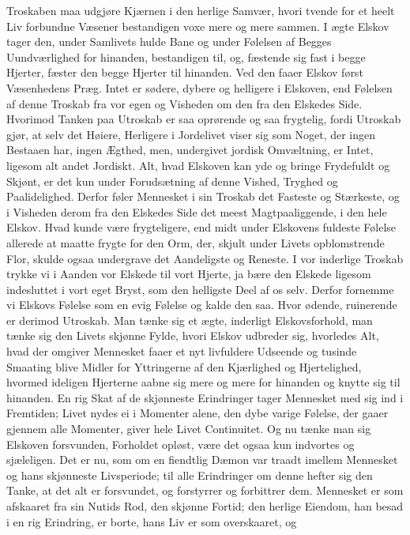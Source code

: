 \documentclass[12pt,a4paper]{book}
\newcommand{\apage}[1]{\marginnote{\footnotesize\textit{[#1]}}}
\begin{document}
Troskaben maa udgjøre Kjærnen i den herlige Samvær, hvori tvende for et
heelt Liv forbundne Væsener bestandigen voxe mere og mere sammen. I ægte
Elskov tager den, under Samlivets hulde Bane og under Følelsen af Begges
Uundværlighed for hinanden, bestandigen til, og, fæstende sig fast i
begge Hjerter, fæster den begge Hjerter til hinanden. Ved den faaer
Elskov først Væsenhedens Præg. Intet er sødere, dybere og helligere i
Elskoven, end Følelsen af denne \apage{61} Troskab fra vor egen og Visheden om den
fra den Elskedes Side. Hvorimod Tanken paa Utroskab er saa oprørende og
saa frygtelig, fordi Utroskab gjør, at selv det Høiere, Herligere i
Jordelivet viser sig som Noget, der ingen Bestaaen har, ingen Ægthed,
men, undergivet jordisk Omvæltning, er Intet, ligesom alt andet
Jordiskt. Alt, hvad Elskoven kan yde og bringe Frydefuldt og Skjønt, er
det kun under Forudsætning af denne Vished, Tryghed og Paalidelighed.
Derfor føler Mennesket i sin Troskab det Fasteste og Stærkeste, og i
Visheden derom fra den Elskedes Side det meest Magtpaaliggende, i den
hele Elskov. Hvad kunde være frygteligere, end midt under Elskovens
fuldeste Følelse allerede at maatte frygte for den Orm, der, skjult
under Livets opblomstrende Flor, skulde ogsaa undergrave det Aandeligste
og Reneste. I vor inderlige Troskab trykke vi i Aanden vor Elskede til
vort Hjerte, ja bære den Elskede ligesom indesluttet i vort eget Bryst,
som den helligste Deel af os selv. Derfor fornemme vi Elskovs Følelse
som en evig Følelse og kalde den saa. Hvor ødende, ruinerende er derimod
Utroskab. Man tænke sig et ægte, inderligt Elskovsforhold, man tænke sig
den Livets skjønne Fylde, hvori Elskov udbreder sig, hvorledes Alt, hvad
der omgiver Mennesket faaer et nyt livfuldere Udseende og tusinde
Smaating blive Midler for Yttringerne af den Kjærlighed og Hjertelighed,
hvormed ideligen Hjerterne aabne sig mere og mere for hinanden og knytte
sig til hinanden. En rig Skat af de \apage{62} skjønneste Erindringer tager
Mennesket med sig ind i Fremtiden; Livet nydes ei i Momenter alene, den
dybe varige Følelse, der gaaer gjennem alle Momenter, giver hele Livet
Continuitet. Og nu tænke man sig Elskoven forsvunden, Forholdet opløst,
være det ogsaa kun indvortes og sjæleligen. Det er nu, som om en
fiendtlig Dæmon var traadt imellem Mennesket og hans skjønneste
Livsperiode; til alle Erindringer om denne hefter sig den Tanke, at det
alt er forsvundet, og forstyrrer og forbittrer dem. Mennesket er som
afskaaret fra sin Nutids Rod, den skjønne Fortid; den herlige Eiendom,
han besad i en rig Erindring, er borte, hans Liv er som overskaaret, og
\end{document}
